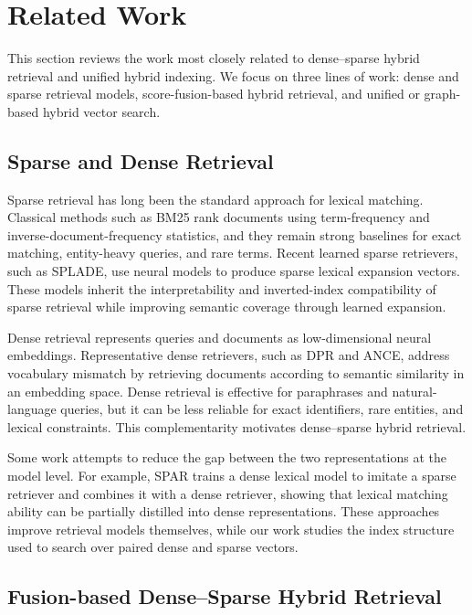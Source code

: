 \section{Related Work}
\label{sec:related}

This section reviews the work most closely related to dense--sparse hybrid retrieval and unified hybrid indexing. We focus on three lines of work: dense and sparse retrieval models, score-fusion-based hybrid retrieval, and unified or graph-based hybrid vector search.

\subsection{Sparse and Dense Retrieval}

Sparse retrieval has long been the standard approach for lexical matching. Classical methods such as BM25 rank documents using term-frequency and inverse-document-frequency statistics, and they remain strong baselines for exact matching, entity-heavy queries, and rare terms. Recent learned sparse retrievers, such as SPLADE, use neural models to produce sparse lexical expansion vectors. These models inherit the interpretability and inverted-index compatibility of sparse retrieval while improving semantic coverage through learned expansion.

Dense retrieval represents queries and documents as low-dimensional neural embeddings. Representative dense retrievers, such as DPR and ANCE, address vocabulary mismatch by retrieving documents according to semantic similarity in an embedding space. Dense retrieval is effective for paraphrases and natural-language queries, but it can be less reliable for exact identifiers, rare entities, and lexical constraints. This complementarity motivates dense--sparse hybrid retrieval.

Some work attempts to reduce the gap between the two representations at the model level. For example, SPAR trains a dense lexical model to imitate a sparse retriever and combines it with a dense retriever, showing that lexical matching ability can be partially distilled into dense representations. These approaches improve retrieval models themselves, while our work studies the index structure used to search over paired dense and sparse vectors.

\subsection{Fusion-based Dense--Sparse Hybrid Retrieval}

